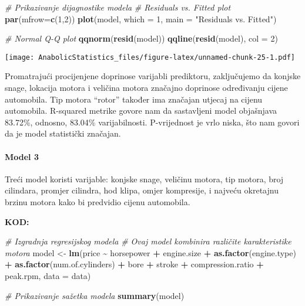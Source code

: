 \documentclass[
]{article}
\newenvironment{Shaded}{\begin{snugshade}}{\end{snugshade}}
\newcommand{\AttributeTok}[1]{\textcolor[rgb]{0.13,0.29,0.53}{#1}}
\newcommand{\CommentTok}[1]{\textcolor[rgb]{0.56,0.35,0.01}{\textit{#1}}}
\newcommand{\DecValTok}[1]{\textcolor[rgb]{0.00,0.00,0.81}{#1}}
\newcommand{\FunctionTok}[1]{\textcolor[rgb]{0.13,0.29,0.53}{\textbf{#1}}}
\newcommand{\NormalTok}[1]{#1}
\newcommand{\OtherTok}[1]{\textcolor[rgb]{0.56,0.35,0.01}{#1}}
\newcommand{\SpecialCharTok}[1]{\textcolor[rgb]{0.81,0.36,0.00}{\textbf{#1}}}
\newcommand{\StringTok}[1]{\textcolor[rgb]{0.31,0.60,0.02}{#1}}
\begin{document}
\begin{Shaded}
\begin{Highlighting}[]
\CommentTok{\# Prikazivanje dijagnostike modela}
\CommentTok{\# Residuals vs. Fitted plot}
\FunctionTok{par}\NormalTok{(}\AttributeTok{mfrow=}\FunctionTok{c}\NormalTok{(}\DecValTok{1}\NormalTok{,}\DecValTok{2}\NormalTok{))}
\FunctionTok{plot}\NormalTok{(model, }\AttributeTok{which =} \DecValTok{1}\NormalTok{, }\AttributeTok{main =} \StringTok{"Residuals vs. Fitted"}\NormalTok{)}

\CommentTok{\# Normal Q{-}Q plot}
\FunctionTok{qqnorm}\NormalTok{(}\FunctionTok{resid}\NormalTok{(model))}
\FunctionTok{qqline}\NormalTok{(}\FunctionTok{resid}\NormalTok{(model), }\AttributeTok{col =} \DecValTok{2}\NormalTok{)}
\end{Highlighting}
\end{Shaded}

\texttt{[image: AnabolicStatistics\_files/figure-latex/unnamed-chunk-25-1.pdf]}

Promatrajući procijenjene doprinose varijabli prediktoru, zaključujemo
da konjske snage, lokacija motora i veličina motora značajno doprinose
određivanju cijene automobila. Tip motora ``rotor'' također ima značajan
utjecaj na cijenu automobila. R-squared metrike govore nam da
sastavljeni model objašnjava 83.72\%, odnosno, 83.04\% varijabilnosti.
P-vrijednost je vrlo niska, što nam govori da je model statistički
značajan.

\paragraph{Model 3}\label{model-3}

Treći model koristi varijable: konjske snage, veličinu motora, tip
motora, broj cilindara, promjer cilindra, hod klipa, omjer kompresije, i
najveću okretajnu brzinu motora kako bi predvidio cijenu automobila.

\textbf{KOD:}

\begin{Shaded}
\begin{Highlighting}[]
\CommentTok{\# Izgradnja regresijskog modela}
\CommentTok{\# Ovaj model kombinira različite karakteristike motora}
\NormalTok{model }\OtherTok{\textless{}{-}} \FunctionTok{lm}\NormalTok{(price }\SpecialCharTok{\textasciitilde{}}\NormalTok{ horsepower }\SpecialCharTok{+}\NormalTok{ engine.size }\SpecialCharTok{+} \FunctionTok{as.factor}\NormalTok{(engine.type) }\SpecialCharTok{+} 
             \FunctionTok{as.factor}\NormalTok{(num.of.cylinders) }\SpecialCharTok{+}\NormalTok{ bore }\SpecialCharTok{+}\NormalTok{ stroke }\SpecialCharTok{+}\NormalTok{ compression.ratio }\SpecialCharTok{+}\NormalTok{ peak.rpm, }
            \AttributeTok{data =}\NormalTok{ data)}

\CommentTok{\# Prikazivanje sažetka modela}
\FunctionTok{summary}\NormalTok{(model)}
\end{Highlighting}
\end{Shaded}
\end{document}
